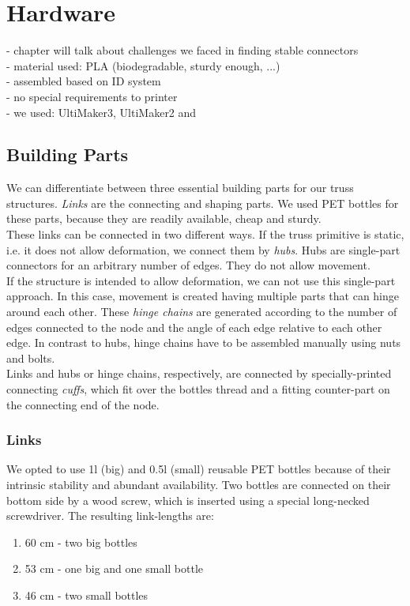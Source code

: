 \chapter{Hardware}\label{ch:hardware}
- chapter will talk about challenges we faced in finding stable connectors\\
- material used: PLA (biodegradable, sturdy enough, ...)\\
- assembled based on ID system\\
- no special requirements to printer\\
- we used: UltiMaker3, UltiMaker2 and 
\section{Building Parts}
We can differentiate between three essential building parts for our truss structures. \textit{Links} are the connecting and shaping parts. We used PET bottles for these parts, because they are readily available, cheap and sturdy.\\
These links can be connected in two different ways. If the truss primitive  is static, i.e. it does not allow deformation, we connect them by \textit{hubs}. Hubs are single-part connectors for an arbitrary number of edges. They do not allow movement.\\
If the structure is intended to allow deformation, we can not use this single-part approach. In this case, movement is created having multiple parts that can hinge around each other. These \textit{hinge chains} are generated according to the number of edges connected to the node and the angle of each edge relative to each other edge. In contrast to hubs, hinge chains have to be assembled manually using nuts and bolts.\\
Links and hubs or hinge chains, respectively, are connected by specially-printed connecting \textit{cuffs}, which fit over the bottles thread and a fitting counter-part on the connecting end of the node.
\subsection{Links}
We opted to use 1l (big) and 0.5l (small) reusable PET bottles because of their intrinsic stability and abundant availability. Two bottles are connected on their bottom side by a wood screw, which is inserted using a special long-necked screwdriver. The resulting link-lengths are:
\begin{enumerate}
\item 60 cm - two big bottles
\item 53 cm - one big and one small bottle
\item 46 cm - two small bottles
\end{enumerate}
